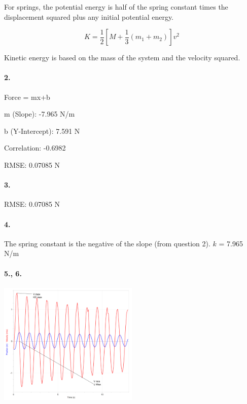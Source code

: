     For springs, the potential energy is half of the spring constant times the displacement squared plus any initial potential energy.

    \begin{equation*}
        K = \frac{1}{2}\left[M + \frac{1}{3}(m_{1} + m_{2})\right]v^{2}
    \end{equation*}

    Kinetic energy is based on the mass of the system and the velocity squared.

    \paragraph*{2.}\hbox{}

    Force = mx+b

    m (Slope): -7.965 N/m

    b (Y-Intercept): 7.591 N

    Correlation: -0.6982

    RMSE: 0.07085 N

    \paragraph*{3.}\hbox{}

    RMSE: 0.07085 N

    \paragraph*{4.}\hbox{}

    The spring constant is the negative of the slope (from question 2).
 	$k$ = 7.965 N/m

    \paragraph*{5., 6.}\hbox{}

    \begin{center}
        \includegraphics[width=0.5\textwidth]{image20.png}
    \end{center}

